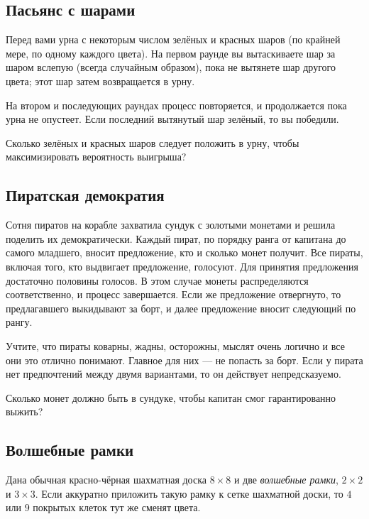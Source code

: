 \subsection*{Пасьянс с шарами}

Перед вами урна с некоторым числом зелёных и красных шаров (по крайней мере, по одному каждого цвета).
На первом раунде вы вытаскиваете шар за шаром вслепую (всегда случайным образом), пока не вытянете шар другого цвета; этот шар затем возвращается в урну.

На втором и последующих раундах процесс повторяется, и продолжается пока урна не опустеет.
Если последний вытянутый шар зелёный, то вы победили.

Сколько зелёных и красных шаров следует положить в урну, чтобы максимизировать вероятность выигрыша?

\subsection*{Пиратская демократия}

Сотня пиратов на корабле захватила сундук с золотыми монетами и решила поделить их демократически.
Каждый пират, по порядку ранга от капитана до самого младшего, вносит предложение, кто и сколько монет получит.
Все пираты, включая того, кто выдвигает предложение, голосуют.
Для принятия предложения достаточно половины голосов.
В этом случае монеты распределяются соответственно, и процесс завершается.
Если же предложение отвергнуто, то предлагавшего выкидывают за борт, и далее предложение вносит следующий по рангу.

Учтите, что пираты коварны, жадны, осторожны, мыслят очень логично и все они это отлично понимают.
Главное для них --- не попасть за борт.
Если у пирата нет предпочтений между двумя вариантами, то он действует непредсказуемо.

Сколько монет должно быть в сундуке, чтобы капитан смог гарантированно выжить?

\subsection*{Волшебные рамки}

Дана обычная красно-чёрная шахматная доска $8 \times 8$ и две \emph{волшебные рамки},  $2 \times 2$ и $3 \times 3$.
Если аккуратно приложить такую рамку к сетке шахматной доски, то $4$ или $9$ покрытых клеток тут же сменят цвета.

